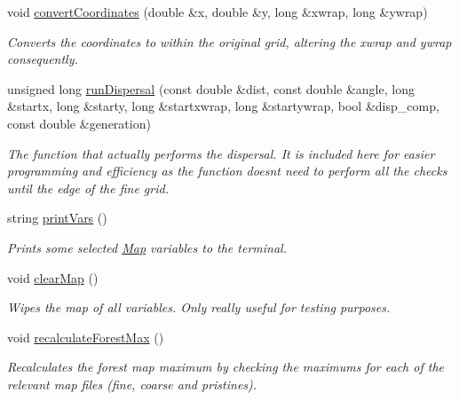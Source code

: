 \begin{DoxyCompactItemize}
void \hyperlink{class_map_af0f4a6a41c91e915614b56b2422d6d5a}{convert\+Coordinates} (double \&x, double \&y, long \&xwrap, long \&ywrap)
\begin{DoxyCompactList}\small\item\em Converts the coordinates to within the original grid, altering the xwrap and ywrap consequently. \end{DoxyCompactList}\item 
unsigned long \hyperlink{class_map_a7c5b0623134a33511d7c17626c967176}{run\+Dispersal} (const double \&dist, const double \&angle, long \&startx, long \&starty, long \&startxwrap, long \&startywrap, bool \&disp\+\_\+comp, const double \&generation)
\begin{DoxyCompactList}\small\item\em The function that actually performs the dispersal. It is included here for easier programming and efficiency as the function doesn\textquotesingle{}t need to perform all the checks until the edge of the fine grid. \end{DoxyCompactList}\item 
string \hyperlink{class_map_af25b0713e794dfa189f0445ffcd511b8}{print\+Vars} ()
\begin{DoxyCompactList}\small\item\em Prints some selected \hyperlink{class_map}{Map} variables to the terminal. \end{DoxyCompactList}\item 
void \hyperlink{class_map_a7ded655c7db0e9d72816430b4f2c83a5}{clear\+Map} ()\hypertarget{class_map_a7ded655c7db0e9d72816430b4f2c83a5}{}\label{class_map_a7ded655c7db0e9d72816430b4f2c83a5}

\begin{DoxyCompactList}\small\item\em Wipes the map of all variables. Only really useful for testing purposes. \end{DoxyCompactList}\item 
void \hyperlink{class_map_ae29adceaa1b65850566286d61c73133b}{recalculate\+Forest\+Max} ()\hypertarget{class_map_ae29adceaa1b65850566286d61c73133b}{}\label{class_map_ae29adceaa1b65850566286d61c73133b}

\begin{DoxyCompactList}\small\item\em Recalculates the forest map maximum by checking the maximums for each of the relevant map files (fine, coarse and pristines). \end{DoxyCompactList}\end{DoxyCompactItemize}
